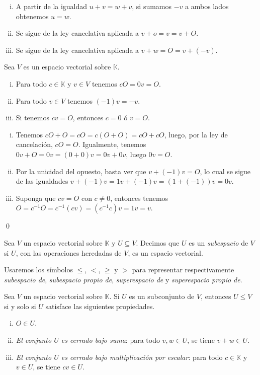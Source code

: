 \dem
\begin{enumerate}[(i)]
  \item A partir de la igualdad $u+v=w+v$, si sumamos $-v$ a ambos lados obtenemos $u=w$.
  \item Se sigue de la ley cancelativa aplicada a $v+o=v=v+O$.
  \item Se sigue de la ley cancelativa aplicada a $v+w=O=v+(-v)$.
\end{enumerate}

\begin{prop}
Sea $V$ es un espacio vectorial sobre $\mathbb{K}$.
\begin{enumerate}[(i)]
\item Para todo $c\in \mathbb{K}$ y $v\in V$ tenemos $cO=0v=O$.
\item Para todo $v\in V$ tenemos $(-1)v=-v$.
\item Si tenemos $cv=O$, entonces $c=0$ \'o $v=O$.
\end{enumerate}
\end{prop}

\dem
\begin{enumerate}[(i)]
\item Tenemos $cO+O=cO=c(O+O)=cO+cO$, luego, por la ley de cancelaci\'on, $cO=O$. Igualmente, tenemos $0v+O=0v=(0+0)v=0v+0v$, luego $0v=O$.
\item Por la unicidad del opuesto, basta ver que $v+(-1)v=O$, lo cual se sigue de las igualdades $v+(-1)v=1v+(-1)v=\left(1+(-1)\right)v=0v$.
\item Suponga que $cv=O$ con $c\ne 0$, entonces tenemos $O=c^{-1}O=c^{-1}(cv)=(c^{-1}c)v=1v=v$.
\end{enumerate}
\qed

\begin{defn}
Sea $V$ un espacio vectorial sobre $\mathbb{K}$ y $U\subseteq V$. Decimos que $U$ es un \emph{subespacio} de $V$ si $U$, con las operaciones heredadas de $V$, es un espacio vectorial.
\end{defn}

\begin{nota}
Usaremos los s\'imbolos $\le$, $<$, $\ge$ y $>$ para representar respectivamente \emph{subespacio de}, \emph{subespacio propio de}, \emph{superespacio de} y \emph{superespacio propio de}.
\end{nota}

\begin{prop}\label{subespsiysolosi}
Sea $V$ un espacio vectorial sobre $\mathbb{K}$. Si $U$ es un subconjunto de $V$, entonces $U\le V$ si y solo si $U$ satisface las siguientes propiedades.
\begin{enumerate}[(i)]
\item $O\in U$.
\item \emph{El conjunto $U$ es cerrado bajo suma}: para todo $v,w\in U$, se tiene $v+w\in U$.
\item \emph{El conjunto $U$ es cerrado bajo multiplicaci\'on por escalar}: para todo $c\in \mathbb{K}$ y $v\in U$, se tiene $cv\in U$.
\end{enumerate} 
\end{prop}

